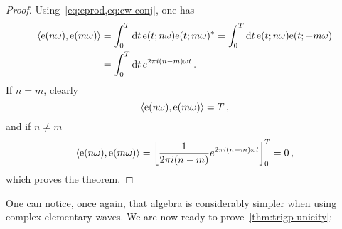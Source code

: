 \begin{proof}
  Using~\cref{eq:eprod,eq:cw-conj}, one has
  \begin{align}
    \braket{\mathrm{e}(n\omega),\mathrm{e}(m\omega)}&=\int_{0}^{T}\mathrm{d} t\,\mathrm{e}(t;n\omega)\mathrm{e}(t;m\omega)^*
    =\int_{0}^{T}\mathrm{d} t\,\mathrm{e}(t;n\omega)\mathrm{e}(t;-m\omega)\\
    &=\int_{0}^{T}\mathrm{d} t\,e^{2\pi i (n-m)\omega t}\,.
  \end{align}
  If $n=m$, clearly
  \begin{equation}
    \braket{\mathrm{e}(n\omega),\mathrm{e}(m\omega)}=T\,,
  \end{equation}
  and if $n\neq m$
  \begin{equation}
    \braket{\mathrm{e}(n\omega),\mathrm{e}(m\omega)}=\left[\frac{1}{2\pi i (n-m)}e^{2\pi i (n-m)\omega t}\right]_0^T=0\,,
  \end{equation}
  which proves the theorem.
\end{proof}
One can notice, once again, that algebra is considerably simpler when using complex elementary waves. We are now ready to prove~\cref{thm:trigp-unicity}:
